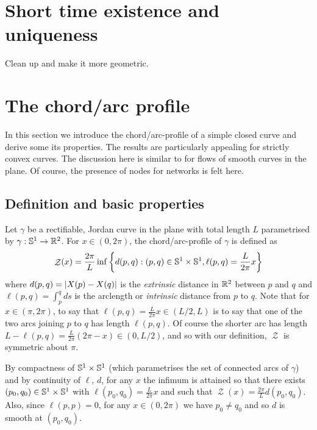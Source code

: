 \documentclass[11pt]{amsart}
\DeclareMathOperator{\chordarcprofile}{\mathcal{Z}}
\begin{document}
\section{Short time existence and uniqueness}
\label{sec:orgheadline6}
Clean up \cite{MR1240580} and make it more geometric.
\section{The chord/arc profile}
\label{sec:orgheadline10}

In this section we introduce the chord/arc-profile of a simple closed curve and derive some its properties. The results are particularly appealing for strictly convex curves. The discussion here is similar to \cite{alpha_csf_dist_comp} for flows of smooth curves in the plane. Of course, the presence of nodes for networks is felt here.

\subsection{Definition and basic properties}
\label{sec:orgheadline7}

\begin{defn}
Let \(\gamma\) be a rectifiable, Jordan curve in the plane with total length \(L\) parametrised by \(\gamma: \mathbb{S}^1 \to \mathbb{R}^2\). For \(x\in (0, 2\pi)\), the chord/arc-profile of \(\gamma\) is defined as
\[
\chordarcprofile (x) = \frac{2\pi}{L} \inf\left\{d(p, q): (p,q) \in \sphere^1\times\sphere^1, \ell(p,q) = \frac{L}{2\pi} x\right\}
\]
where \(d(p,q) = \left|X(p) - X(q)\right|\) is the \emph{extrinsic} distance in \(\mathbb{R}^2\) between \(p\) and \(q\) and \(\ell(p,q) = \int_p^q ds\) is the arclength or \emph{intrinsic} distance from \(p\) to \(q\). Note that for \(x \in (\pi, 2\pi)\), to say that \(\ell(p,q) = \frac{L}{2\pi} x \in (L/2,L)\) is to say that one of the two arcs joining \(p\) to \(q\) has length \(\ell(p,q)\). Of course the shorter arc has length \(L-\ell(p,q) = \frac{L}{2\pi}(2\pi - x) \in (0, L/2)\), and so with our definition, \(\chordarcprofile\) is symmetric about \(\pi\).
\end{defn}

\begin{remark}
By compactness of \(\mathbb{S}^1\times \mathbb{S}^1\) (which parametrises the set of connected arcs of \(\gamma\)) and by continuity of \(\ell\), \(d\), for any \(x\) the infimum is attained so that there exists \((p_0,q_0) \in \mathbb{S}^1 \times \mathbb{S}^1\) with \(\ell(p_0, q_0) = \frac{L}{2\pi}x\) and such that \(\chordarcprofile(x) = \frac{2\pi}{L} d(p_0, q_0)\). Also, since \(\ell(p,p) = 0\), for any \(x\in(0,2\pi)\) we have \(p_0 \ne q_0\) and so \(d\) is smooth at \((p_0, q_0)\).
\end{remark}
\end{document}

